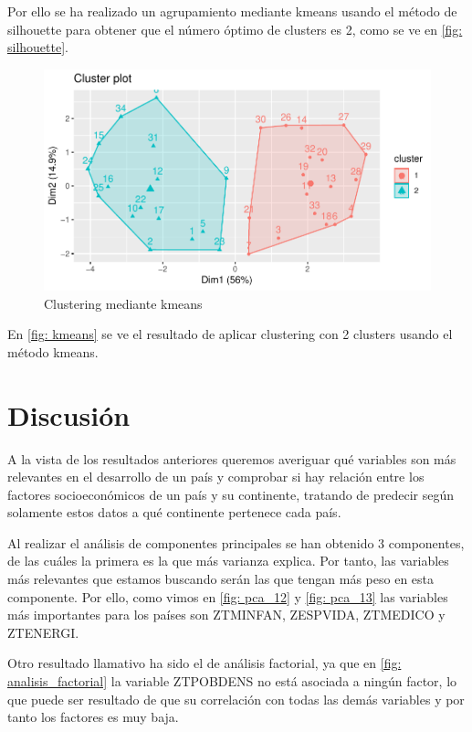 \documentclass[twoside,openright,titlepage,numbers=noenddot,openany,headinclude,footinclude=true,
cleardoublepage=empty,abstractoff,BCOR=5mm,paper=a4,fontsize=12pt,main=spanish]{scrreprt}
\begin{document}
Por ello se ha realizado un agrupamiento mediante kmeans usando el método de silhouette para obtener que el número óptimo de clusters es 2, como se ve en \eqref{fig: silhouette}.

\begin{figure}[H]
\includegraphics[scale=1]{kmeans.pdf}
\caption{Clustering mediante kmeans}
\label{fig: kmeans}
\end{figure}

En \eqref{fig: kmeans} se ve el resultado de aplicar clustering con 2 clusters usando el método kmeans.

\section{Discusión}

A la vista de los resultados anteriores queremos averiguar qué variables son más relevantes en el desarrollo de un país y comprobar si hay relación entre los factores socioeconómicos de un país y su continente, tratando de predecir según solamente estos datos a qué continente pertenece cada país.

Al realizar el análisis de componentes principales se han obtenido $3$ componentes, de las cuáles la primera es la que más varianza explica. Por tanto, las variables más relevantes que estamos buscando serán las que tengan más peso en esta componente. Por ello, como vimos en \eqref{fig: pca_12} y \eqref{fig: pca_13} las variables más importantes para los países son ZTMINFAN, ZESPVIDA, ZTMEDICO y ZTENERGI.

Otro resultado llamativo ha sido el de análisis factorial, ya que en \eqref{fig: analisis_factorial} la variable ZTPOBDENS no está asociada a ningún factor, lo que puede ser resultado de que su correlación con todas las demás variables y por tanto los factores es muy baja.
\end{document}
